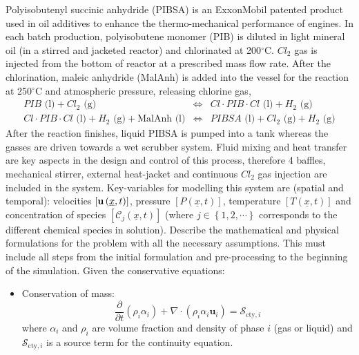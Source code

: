 \documentclass[calculator,datasheet]{exam}
\newcommand{\frc}{\displaystyle\frac}
\begin{document}
\clearpage

\begin{question}
Polyisobutenyl succinic anhydride (PIBSA) is an ExxonMobil patented product used in oil additives to enhance the thermo-mechanical performance of engines. In each batch production, polyisobutene monomer (PIB) is diluted in light mineral oil (in a stirred and jacketed reactor) and chlorinated at 200$^{\circ}$C. $Cl_{2}$ gas is injected from the bottom of reactor at a prescribed mass flow rate. After the chlorination, maleic anhydride (MalAnh) is added into the vessel for the reaction at 250$^{\circ}$C and atmospheric pressure, releasing chlorine gas,
\begin{eqnarray}
 PIB \text{ (l)} + Cl_{2} \text{ (g)} &\Longleftrightarrow& Cl \cdot PIB \cdot Cl \text{ (l)} + H_{2} \text{ (g)}\nonumber \\
 Cl \cdot PIB \cdot Cl \text{ (l)} + H_{2} \text{ (g)} + \text{MalAnh (l)} &\Longleftrightarrow& PIBSA \text{ (l)} + Cl_{2} \text{ (g)} + H_{2} \text{ (g)} \nonumber 
\end{eqnarray}
After the reaction finishes, liquid PIBSA is pumped into a tank whereas the gasses are driven towards a wet scrubber system. Fluid mixing and heat transfer are key aspects in the design and control of this process, therefore 4 baffles, mechanical stirrer, external heat-jacket and continuous $Cl_{2}$ gas injection are included in the system. Key-variables for modelling this system are (spatial and temporal): velocities $\left[{\bf u}\left(\underline{x},t\right)\right]$, pressure $\left[P\left(\underline{x},t\right)\right]$, temperature $\left[T\left(\underline{x},t\right)\right]$ and concentration of species $\left[\mathcal{C}_{j}\left(\underline{x},t\right)\right]$ (where $j\in\left\{1,2,\cdots\right\}$ corresponds to the different chemical species in solution). Describe the mathematical and physical formulations for the problem with all the necessary assumptions. This must include all steps from the initial formulation and pre-processing to the beginning of the simulation. Given the conservative equations:~
\begin{itemize}
\item Conservation of mass:
\begin{displaymath}
\frc{\partial}{\partial t}\left(\rho_{i}\alpha_{i}\right) + \nabla\cdot\left(\rho_{i}\alpha_{i}\mathbf{u}_{i}\right)=\mathcal{S}_{\text{cty},i}
\end{displaymath}
where $\alpha_{i}$ and $\rho_{i}$ are volume fraction and density of phase $i$ (gas or liquid) and $\mathcal{S}_{\text{cty},i}$ is a source term for the continuity equation.


\end{itemize}
\end{question}
\end{document}
